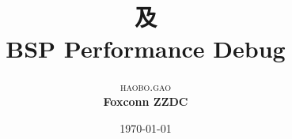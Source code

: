 \documentclass [a4paper,12pt,oneside] {report}
\begin{document}
\title{\textbf{ }\\ %
及 \\BSP Performance Debug} %

\author{\textsc{haobo.gao} %
\\{\textbf{Foxconn ZZDC}}} %

\date{\today} %
\maketitle



\end{document}
